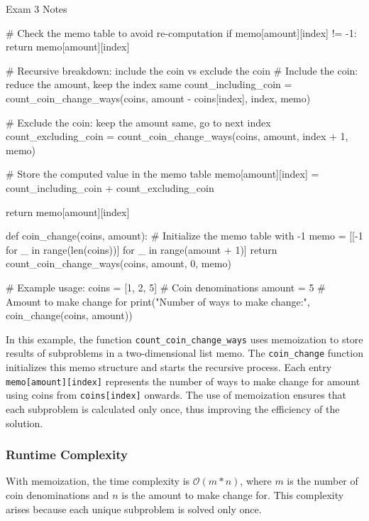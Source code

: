\begin{examnotes}{Exam 3 Notes}
\begin{highlight}
\begin{code}[Python]
        # Check the memo table to avoid re-computation
        if memo[amount][index] != -1:
            return memo[amount][index]

        # Recursive breakdown: include the coin vs exclude the coin
        # Include the coin: reduce the amount, keep the index same
        count_including_coin = count_coin_change_ways(coins, amount - coins[index], index, memo)

        # Exclude the coin: keep the amount same, go to next index
        count_excluding_coin = count_coin_change_ways(coins, amount, index + 1, memo)

        # Store the computed value in the memo table
        memo[amount][index] = count_including_coin + count_excluding_coin

        return memo[amount][index]
    
    def coin_change(coins, amount):
        # Initialize the memo table with -1
        memo = [[-1 for _ in range(len(coins))] for _ in range(amount + 1)]
        return count_coin_change_ways(coins, amount, 0, memo)
    
    # Example usage:
    coins = [1, 2, 5]  # Coin denominations
    amount = 5  # Amount to make change for
    print("Number of ways to make change:", coin_change(coins, amount))    
    \end{code}
        In this example, the function \texttt{count\_coin\_change\_ways} uses memoization to store results of subproblems in a two-dimensional list memo. The \texttt{coin\_change} function initializes this 
        memo structure and starts the recursive process. Each entry \texttt{memo[amount][index]} represents the number of ways to make change for amount using coins from \texttt{coins[index]} onwards. The 
        use of memoization ensures that each subproblem is calculated only once, thus improving the efficiency of the solution. \vspace*{1em}

        \subsubsection*{Runtime Complexity}

        With memoization, the time complexity is $\mathcal{O}(m*n)$, where $m$ is the number of coin denominations and $n$ is the amount to make change for. This complexity arises because each unique 
        subproblem is solved only once. \vspace*{1em}


\end{highlight}
\end{examnotes}
